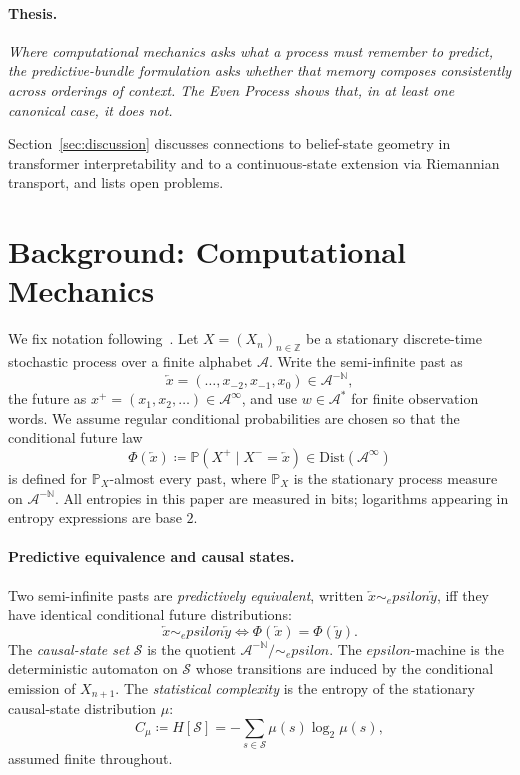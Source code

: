 \documentclass[11pt,a4paper]{article}
\def\varepsilon{epsilon}%
\theoremstyle{plain}
\theoremstyle{definition}
\theoremstyle{remark}
\newcommand{\Dist}{\mathrm{Dist}}
\newcommand{\Prob}{\mathbb{P}}
\newcommand{\eqdef}{\coloneqq}
\newcommand{\Alphabet}{\mathcal{A}}
\newcommand{\States}{\mathcal{S}}
\newcommand{\Past}{\overleftarrow{x}}
\newcommand{\Pasts}{\Alphabet^{-\mathbb{N}}}
\begin{document}
\paragraph{Thesis.} \emph{Where computational mechanics asks what a process must remember to predict, the predictive-bundle formulation asks whether that memory composes consistently across orderings of context. The Even Process shows that, in at least one canonical case, it does not.}

Section~\ref{sec:discussion} discusses connections to belief-state geometry in transformer interpretability and to a continuous-state extension via Riemannian transport, and lists open problems.

\section{Background: Computational Mechanics}
\label{sec:background}

We fix notation following~\cite{shalizi2001}. Let $X = (X_n)_{n \in \mathbb{Z}}$ be a stationary discrete-time stochastic process over a finite alphabet $\Alphabet$. Write the semi-infinite past as
\begin{equation}
    \Past = (\ldots, x_{-2}, x_{-1}, x_0) \in \Pasts,
\end{equation}
the future as $x^+ = (x_1, x_2, \ldots) \in \Alphabet^\infty$, and use $w \in \Alphabet^*$ for finite observation words. We assume regular conditional probabilities are chosen so that the conditional future law
\begin{equation}
    \Phi(\Past) \eqdef \Prob(X^+ \mid X^- = \Past) \in \Dist(\Alphabet^\infty)
\end{equation}
is defined for $\Prob_X$-almost every past, where $\Prob_X$ is the stationary process measure on $\Pasts$. All entropies in this paper are measured in bits; logarithms appearing in entropy expressions are base $2$.

\paragraph{Predictive equivalence and causal states.}
Two semi-infinite pasts are \emph{predictively equivalent}, written $\Past \sim_\varepsilon \overleftarrow{y}$, iff they have identical conditional future distributions:
\begin{equation}
    \Past \sim_\varepsilon \overleftarrow{y} \iff \Phi(\Past) = \Phi(\overleftarrow{y}).
\end{equation}
The \emph{causal-state set} $\States$ is the quotient $\Pasts / {\sim_\varepsilon}$. The $\varepsilon$-machine is the deterministic automaton on $\States$ whose transitions are induced by the conditional emission of $X_{n+1}$. The \emph{statistical complexity} is the entropy of the stationary causal-state distribution $\mu$:
\begin{equation}
    C_\mu \eqdef H[\States] = -\sum_{s \in \States} \mu(s) \log_2 \mu(s),
\end{equation}
assumed finite throughout.
\end{document}

